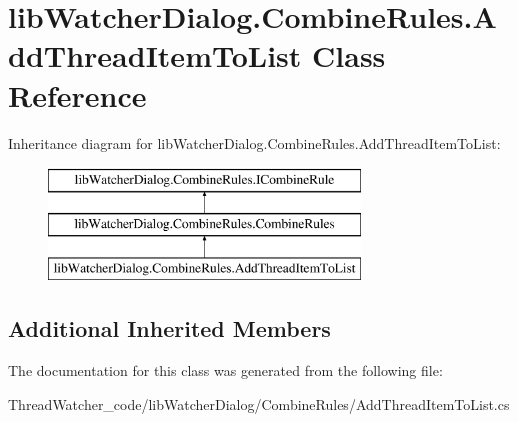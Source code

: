 \hypertarget{classlib_watcher_dialog_1_1_combine_rules_1_1_add_thread_item_to_list}{\section{lib\+Watcher\+Dialog.\+Combine\+Rules.\+Add\+Thread\+Item\+To\+List Class Reference}
\label{classlib_watcher_dialog_1_1_combine_rules_1_1_add_thread_item_to_list}
}
Inheritance diagram for lib\+Watcher\+Dialog.\+Combine\+Rules.\+Add\+Thread\+Item\+To\+List\+:\begin{figure}[H]
\begin{center}
\leavevmode
\includegraphics[height=3.000000cm]{classlib_watcher_dialog_1_1_combine_rules_1_1_add_thread_item_to_list}
\end{center}
\end{figure}
\subsection*{Additional Inherited Members}


The documentation for this class was generated from the following file\+:\begin{DoxyCompactItemize}
\item 
Thread\+Watcher\+\_\+code/lib\+Watcher\+Dialog/\+Combine\+Rules/Add\+Thread\+Item\+To\+List.\+cs\end{DoxyCompactItemize}
